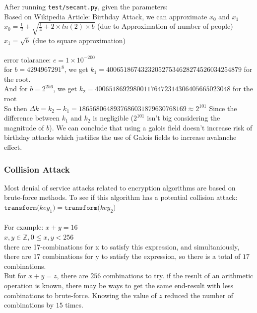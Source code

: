 \documentclass[fleqn, a4paper,12pt]{article}
\begin{document}
After running \texttt{test/secant.py}, given the parameters: \\
Based on Wikipedia Article: Birthday Attack, we can approximate $x_0$ and $x_1$ \\
$x_0 = \frac{1}{2}+\sqrt{\frac{1}{4}+2 \times ln(2) \times b}$ (due to Approximation of number of people) \\
$x_1 = \sqrt{b}$ (due to square approximation) \\
\\ error tolarance:
$e = 1 \times 10^{-200}$ \\
for $b=4294967291^8$,  we get $k_1 = 400651867432320527534628274526034254879$ for the root. \\
And for $b = 2^{256}$, we get $k_2 = 400651869298001176472314306405665023048$ for the root \\
So then $\Delta k = k_2 - k_1 = 1865680648937686031879630768169 \approx 2^{101}$
Since the difference between $k_1$ and $k_2$ is negligible ($2^{101}$ isn't big considering the magnitude of $b$). We can conclude  that using a galois field doesn't increase risk of birthday attacks which justifies the use of Galois fields to increase avalanche effect.

\subsubsection {Collision Attack} \label{collision_attack}

Most denial of service attacks related to encryption algorithms are based on brute-force methods. To see if this algorithm has a potential collision attack: \\
$\texttt{transform(} key_1 \texttt{)} = \texttt{transform(} key_2 \texttt{)}$ \\
\\
For example: $x + y = 16$ \\

$ x,y \in \mathbb{Z}, 0 \leq x,y < 256$ \\
there are 17-combinations for x to satisfy this expression, and simultaniously, there are 17 combinations for y to satisfy the expression, so there is a total of $17$ combinations.
\\
But for $x + y = z$, there are $256$ combinations to try. if the result of an arithmetic operation is known, there may be ways to get the same end-result with less combinations to brute-force. Knowing the value of $z$ reduced the number of combinations by $15$ times.
\end{document}
